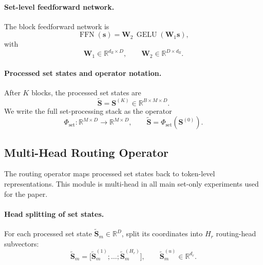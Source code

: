 \documentclass{article}
\theoremstyle{plain}
\theoremstyle{definition}
\theoremstyle{remark}
\begin{document}
\paragraph{Set-level feedforward network.}
The block feedforward network is
\begin{equation}
\label{eq:ffn}
\operatorname{FFN}(\mathbf s)=\mathbf W_2\,\operatorname{GELU}(\mathbf W_1\mathbf s),
\end{equation}
with
\begin{equation}
\mathbf W_1\in\mathbb R^{d_{\mathrm{ff}}\times D},
\qquad
\mathbf W_2\in\mathbb R^{D\times d_{\mathrm{ff}}}.
\end{equation}

\paragraph{Processed set states and operator notation.}
After $K$ blocks, the processed set states are
\begin{equation}
\label{eq:final-set-states}
\widetilde{\mathbf S}=\mathbf S^{(K)}\in\mathbb R^{B\times M\times D}.
\end{equation}
We write the full set-processing stack as the operator
\begin{equation}
\label{eq:set-stack-operator}
\Phi_{\mathrm{set}}:\mathbb R^{M\times D}\to\mathbb R^{M\times D},
\qquad
\widetilde{\mathbf S}=\Phi_{\mathrm{set}}(\mathbf S^{(0)}).
\end{equation}

\subsection{Multi-Head Routing Operator}
\label{sec:routing-operator}

The routing operator maps processed set states back to token-level representations. This module is multi-head in all main set-only experiments used for the paper.

\paragraph{Head splitting of set states.}
For each processed set state $\widetilde{\mathbf S}_m\in\mathbb R^D$, split its coordinates into $H_r$ routing-head subvectors:
\begin{equation}
\label{eq:head-split}
\widetilde{\mathbf S}_m=\bigl[\widetilde{\mathbf S}_m^{(1)};\dots;\widetilde{\mathbf S}_m^{(H_r)}\bigr],
\qquad
\widetilde{\mathbf S}_m^{(u)}\in\mathbb R^{d_r}.
\end{equation}
\end{document}

